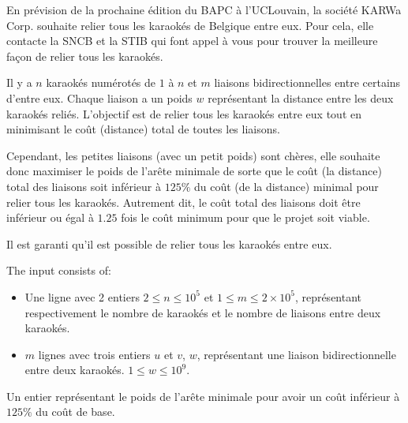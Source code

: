 \problemname{\problemyamlname}


En prévision de la prochaine édition du BAPC à l'UCLouvain, la société KARWa Corp. souhaite relier tous les karaokés de Belgique entre eux.
Pour cela, elle contacte la SNCB et la STIB qui font appel à vous pour trouver la meilleure façon de relier tous les karaokés.

Il y a $n$ karaokés numérotés de $1$ à $n$ et $m$ liaisons bidirectionnelles entre certains d'entre eux.
Chaque liaison a un poids $w$ représentant la distance entre les deux karaokés reliés.
L'objectif est de relier tous les karaokés entre eux tout en minimisant le coût (distance) total de toutes les liaisons.

Cependant, les petites liaisons (avec un petit poids) sont chères, elle souhaite donc maximiser le poids de l'arête minimale de sorte que le coût (la distance) total des liaisons soit inférieur à $125\%$ du coût (de la distance) minimal pour relier tous les karaokés.
Autrement dit, le coût total des liaisons doit être inférieur ou égal à $1.25$ fois le coût minimum pour que le projet soit viable.

Il est garanti qu'il est possible de relier tous les karaokés entre eux.

\begin{Input}
	The input consists of:
	\begin{itemize}
		\item Une ligne avec 2 entiers $2 \le n \le 10^5$ et $1 \le m \le 2 \times 10^5$, représentant respectivement le nombre de karaokés et le nombre de liaisons entre deux karaokés.
		\item $m$ lignes avec trois entiers $u$ et $v$, $w$, représentant une liaison bidirectionnelle entre deux karaokés. $1 \le w \le 10^9$.
	\end{itemize}
\end{Input}

\begin{Output}
	Un entier représentant le poids de l'arête minimale pour avoir un coût inférieur à $125\%$ du coût de base.
\end{Output}

